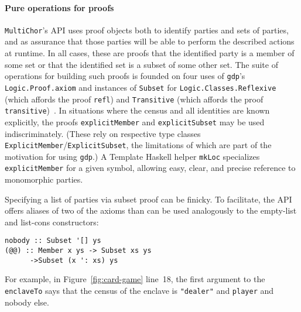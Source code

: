 \documentclass[sigplan,screen,review,anonymous]{acmart}
\newcommand{\inlinecode}[2][haskell]{\texttt{#2}}
\newcommand{\MultiChor}{\texttt{Multi\-Chor}\xspace}
\begin{document}
\paragraph{Pure operations for proofs}
\MultiChor's API uses proof objects both to identify parties and sets of parties,
and as assurance that those parties will be able to perform the described actions at runtime.
In all cases, these are proofs that the identified party is a member of some set
or that the identified set is a subset of some other set.
The suite of operations for building such proofs is founded on four uses of
\inlinecode[text]{gdp}'s \inlinecode{Logic.Proof.axiom}
and instances of \inlinecode{Subset} for \inlinecode{Logic.Classes.Reflexive}
(which affords the proof \inlinecode{refl})
and \inlinecode{Transitive} (which affords the proof \inlinecode{transitive})~\cite{gdp_hackage}.
In situations where the census and all identities are known explicitly,
the proofs \inlinecode{explicitMember} and \inlinecode{explicitSubset} may be used indiscriminately.
(These rely on respective type classes \inlinecode{ExplicitMember}/\inlinecode{ExplicitSubset},
the limitations of which are part of the motivation for using
\inlinecode[text]{gdp}.)
A Template Haskell helper \inlinecode{mkLoc} specializes \inlinecode{explicitMember} for a given 
symbol, allowing easy, clear, and precise reference to monomorphic parties.

Specifying a list of parties via subset proof can be finicky.
To facilitate, the API offers aliases of two of the axioms
than can be used analogously to the empty-list and list-cons constructors:
%
\begin{verbatim}
nobody :: Subset '[] ys
(@@) :: Member x ys -> Subset xs ys
      ->Subset (x ': xs) ys
\end{verbatim}
%
For example, in Figure~\ref{fig:card-game} line~18, the first argument to the
\inlinecode{enclaveTo}
says that the census of the enclave is
\inlinecode{"dealer"} and \inlinecode{player} and nobody else.
\end{document}
